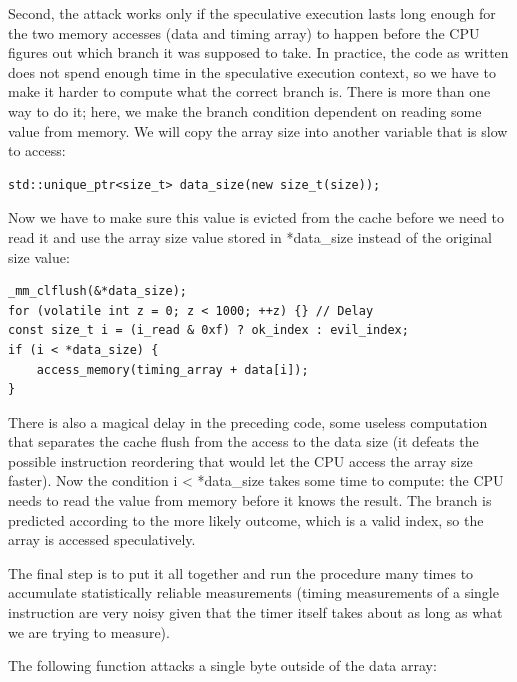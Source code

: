 Second, the attack works only if the speculative execution lasts long enough for the two memory accesses (data and timing array) to happen before the CPU figures out which branch it was supposed to take. In practice, the code as written does not spend enough time in the speculative execution context, so we have to make it harder to compute what the correct branch is. There is more than one way to do it; here, we make the branch condition dependent on reading some value from memory. We will copy the array size into another variable that is slow to access:

\begin{lstlisting}[style=styleCXX]
std::unique_ptr<size_t> data_size(new size_t(size));
\end{lstlisting}

Now we have to make sure this value is evicted from the cache before we need to read it and use the array size value stored in *data\_size instead of the original size value:

\begin{lstlisting}[style=styleCXX]
_mm_clflush(&*data_size);
for (volatile int z = 0; z < 1000; ++z) {} // Delay
const size_t i = (i_read & 0xf) ? ok_index : evil_index;
if (i < *data_size) {
	access_memory(timing_array + data[i]);
}
\end{lstlisting}

There is also a magical delay in the preceding code, some useless computation that separates the cache flush from the access to the data size (it defeats the possible instruction reordering that would let the CPU access the array size faster). Now the condition i < *data\_size takes some time to compute: the CPU needs to read the value from memory before it knows the result. The branch is predicted according to the more likely outcome, which is a valid index, so the array is accessed speculatively.


The final step is to put it all together and run the procedure many times to accumulate statistically reliable measurements (timing measurements of a single instruction are very noisy given that the timer itself takes about as long as what we are trying to measure).

The following function attacks a single byte outside of the data array:

